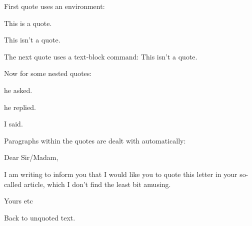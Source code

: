 \documentclass{article}
\begin{document}
First quote uses an environment:
\begin{qt}This is a quote.\end{qt} This isn't a quote.

The next quote uses a text-block command:
 This isn't a quote.

Now for some nested quotes:

 he asked.

 he replied.

 I said.

Paragraphs within the quotes are dealt with automatically:

\begin{qt}Dear Sir/Madam,

I am writing to inform you that I would like you to quote this
letter in your so-called  article, which I don't find
the least bit amusing.

Yours etc\end{qt}

Back to unquoted text.
\end{document}
